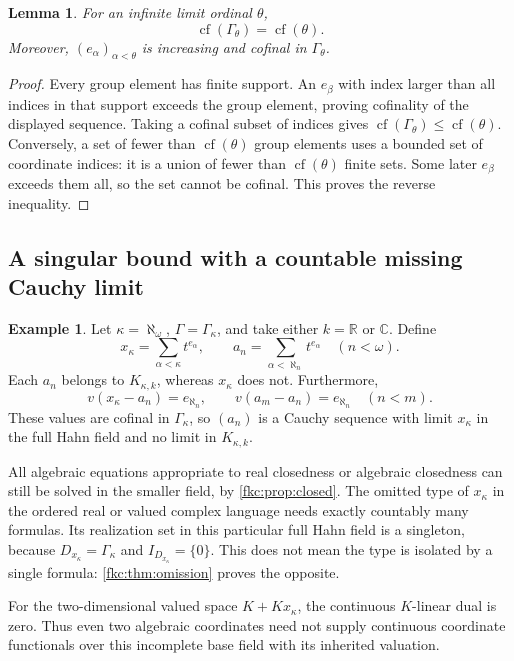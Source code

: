 \documentclass[11pt,letterpaper]{article}
\numberwithin{equation}{section}
\newtheorem{lemma}[theorem]{Lemma}
\theoremstyle{definition}
\newtheorem{example}[theorem]{Example}
\theoremstyle{remark}
\newcommand{\R}{\mathbb R}
\newcommand{\C}{\mathbb C}
\newcommand{\cf}{\operatorname{cf}}
\begin{document}
\begin{lemma}\label{fkc:lem:groupcf}
For an infinite limit ordinal $\theta$,
\[
 \cf(\Gamma_\theta)=\cf(\theta).
\]
Moreover, $(e_\alpha)_{\alpha<\theta}$ is increasing and cofinal in $\Gamma_\theta$.
\end{lemma}
\begin{proof}
Every group element has finite support. An $e_\beta$ with index larger than all indices in that support exceeds the group element, proving cofinality of the displayed sequence. Taking a cofinal subset of indices gives $\cf(\Gamma_\theta)\le\cf(\theta)$. Conversely, a set of fewer than $\cf(\theta)$ group elements uses a bounded set of coordinate indices: it is a union of fewer than $\cf(\theta)$ finite sets. Some later $e_\beta$ exceeds them all, so the set cannot be cofinal. This proves the reverse inequality.
\end{proof}

\subsection{A singular bound with a countable missing Cauchy limit}
\begin{example}\label{fkc:ex:singular}
Let $\kappa=\aleph_\omega$, $\Gamma=\Gamma_\kappa$, and take either $k=\R$ or $\C$. Define
\begin{equation}\label{fkc:eq:xkappa}
 x_\kappa=\sum_{\alpha<\kappa}t^{e_\alpha},\qquad
 a_n=\sum_{\alpha<\aleph_n}t^{e_\alpha}\quad(n<\omega).
\end{equation}
Each $a_n$ belongs to $K_{\kappa,k}$, whereas $x_\kappa$ does not. Furthermore,
\[
 v(x_\kappa-a_n)=e_{\aleph_n},\qquad
 v(a_m-a_n)=e_{\aleph_n}\quad(n<m).
\]
These values are cofinal in $\Gamma_\kappa$, so $(a_n)$ is a Cauchy sequence with limit $x_\kappa$ in the full Hahn field and no limit in $K_{\kappa,k}$.
\end{example}

All algebraic equations appropriate to real closedness or algebraic closedness can still be solved in the smaller field, by \cref{fkc:prop:closed}. The omitted type of $x_\kappa$ in the ordered real or valued complex language needs exactly countably many formulas. Its realization set in this particular full Hahn field is a singleton, because $D_{x_\kappa}=\Gamma_\kappa$ and $I_{D_{x_\kappa}}=\{0\}$. This does not mean the type is isolated by a single formula: \cref{fkc:thm:omission} proves the opposite.

For the two-dimensional valued space $K+Kx_\kappa$, the continuous $K$-linear dual is zero. Thus even two algebraic coordinates need not supply continuous coordinate functionals over this incomplete base field with its inherited valuation.
\end{document}
